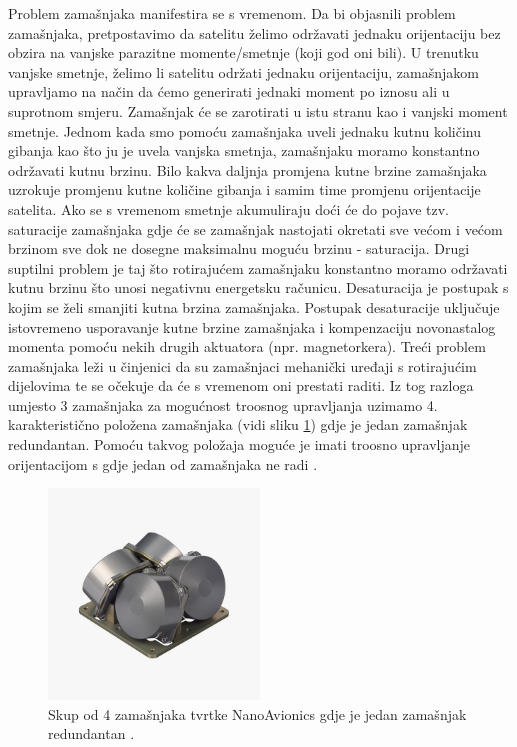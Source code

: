 \documentclass[times, utf8, diplomski, numeric]{templates/template}
\begin{document}
{{{{                Problem zamašnjaka manifestira se s vremenom. Da bi objasnili problem zamašnjaka, pretpostavimo da satelitu želimo održavati jednaku orijentaciju bez obzira na vanjske parazitne momente/smetnje (koji god oni bili). U trenutku vanjske smetnje, želimo li satelitu održati jednaku orijentaciju, zamašnjakom upravljamo na način da ćemo generirati jednaki moment po iznosu ali u suprotnom smjeru. Zamašnjak će se zarotirati u istu stranu kao i vanjski moment smetnje. Jednom kada smo pomoću zamašnjaka uveli jednaku kutnu količinu gibanja kao što ju je uvela vanjska smetnja, zamašnjaku moramo konstantno održavati kutnu brzinu. Bilo kakva daljnja promjena kutne brzine zamašnjaka uzrokuje promjenu kutne količine gibanja i samim time promjenu orijentacije satelita. Ako se s vremenom smetnje akumuliraju doći će do pojave tzv. saturacije zamašnjaka gdje će se zamašnjak nastojati okretati sve većom i većom brzinom sve dok ne dosegne maksimalnu moguću brzinu - saturacija. Drugi suptilni problem je taj što rotirajućem zamašnjaku konstantno moramo održavati kutnu brzinu što unosi negativnu energetsku računicu. Desaturacija je postupak s kojim se želi smanjiti kutna brzina zamašnjaka. Postupak desaturacije uključuje istovremeno usporavanje kutne brzine zamašnjaka i kompenzaciju novonastalog momenta pomoću nekih drugih aktuatora (npr. magnetorkera). Treći problem zamašnjaka leži u činjenici da su zamašnjaci mehanički uređaji s rotirajućim dijelovima te se očekuje da će s vremenom oni prestati raditi. Iz tog razloga umjesto 3 zamašnjaka za mogućnost troosnog upravljanja uzimamo 4. karakteristično položena zamašnjaka (vidi sliku \ref{fig:cetiri_zamasnjaka}) gdje je jedan zamašnjak redundantan. Pomoću takvog položaja moguće je imati troosno upravljanje orijentacijom s gdje jedan od zamašnjaka ne radi \cite{cetiriZamasnjaka}.

                \begin{figure}[htb]
                \centering
                \includegraphics[width=0.5\textwidth]{images/cetiri_zamasnjaka.jpg}
                \caption{Skup od 4 zamašnjaka tvrtke NanoAvionics gdje je jedan zamašnjak redundantan \cite{cetiriZamasnjakaTvrtka}.}
                \label{fig:cetiri_zamasnjaka}
                \end{figure}
            }
        }
    }

}
\end{document}
